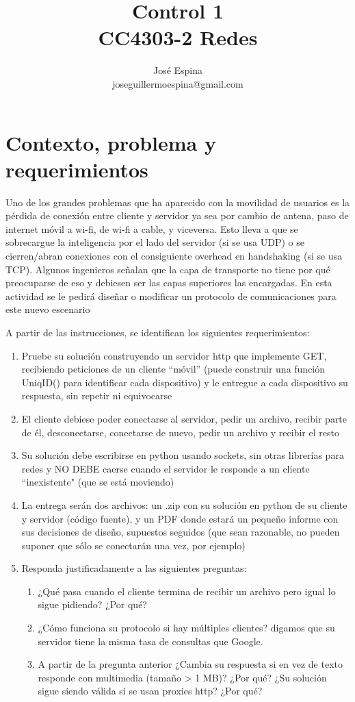\documentclass{article}
\begin{document}
\title{Control 1\\CC4303-2 Redes}
\author{José Espina\\joseguillermoespina@gmail.com}
\date{}
\maketitle
\section{Contexto, problema y requerimientos}
Uno de los grandes problemas que ha aparecido con la movilidad de usuarios es la pérdida de conexión entre cliente y servidor ya sea por cambio de antena, paso de internet móvil a wi-fi, de wi-fi a cable, y viceversa. Esto lleva a que se sobrecargue la inteligencia por el lado del servidor (si se usa UDP) o se cierren/abran conexiones con el consiguiente overhead en handshaking (si se usa TCP). Algunos ingenieros señalan que la capa de transporte no tiene por qué preocuparse de eso y debiesen ser las capas superiores las encargadas. En esta actividad se le pedirá diseñar o modificar un protocolo de comunicaciones para este nuevo escenario

A partir de las instrucciones, se identifican los siguientes requerimientos:
\begin{enumerate}
\item Pruebe su solución construyendo un servidor http que implemente GET, recibiendo peticiones de un cliente “móvil” (puede construir una función UniqID() para identificar cada dispositivo) y le entregue a cada dispositivo su respuesta, sin repetir ni equivocarse
\item El cliente debiese poder conectarse al servidor, pedir un archivo, recibir parte de él, desconectarse, conectarse de nuevo, pedir un archivo y recibir el resto
\item Su solución debe escribirse en python usando sockets, sin otras librerías para redes y NO DEBE caerse cuando el servidor le responde a un cliente ``inexistente" (que se está moviendo)
\item La entrega serán dos archivos: un .zip con su solución en python de su cliente y servidor (código fuente), y un PDF donde estará un pequeño informe con sus decisiones de diseño, supuestos seguidos (que sean razonable, no pueden suponer que sólo se conectarán una vez, por ejemplo)
\item Responda justificadamente a las siguientes preguntas:
\begin{enumerate}
\item ¿Qué pasa cuando el cliente termina de recibir un archivo pero igual lo sigue pidiendo? ¿Por qué?
\item ¿Cómo funciona su protocolo si hay múltiples clientes? digamos que su servidor tiene la misma tasa de consultas que Google.
\item A partir de la pregunta anterior ¿Cambia su respuesta si en vez de texto responde con multimedia (tamaño > 1 MB)? ¿Por qué?
¿Su solución sigue siendo válida si se usan proxies http? ¿Por qué?
\end{enumerate}
\end{enumerate}
\end{document}
